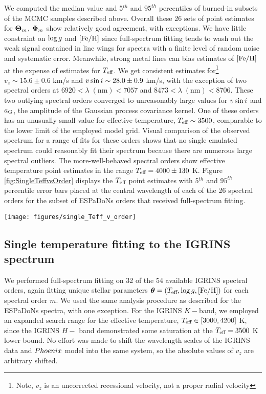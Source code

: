 \documentclass[onecolumn]{emulateapj}%
\begin{document}
We computed the median value and 5$^{th}$ and $95^{th}$ percentiles of burned-in subsets of the MCMC samples described above.  Overall these 26 sets of point estimates for ${\bm \Theta}_{m}$, ${\bm \Phi}_m$ show relatively good agreement, with exceptions.  We have little constraint on $\log g$ and $[{\rm Fe}/{\rm H}]$ since full-spectrum fitting tends to wash out the weak signal contained in line wings for spectra with a finite level of random noise and systematic error.  Meanwhile, strong metal lines can bias estimates of $[{\rm Fe}/{\rm H}]$ at the expense of estimates for $T_\textrm{eff}$.  We get consistent estimates for\footnote{Note, $v_z$ is an uncorrected recessional velocity, not a proper radial velocity} $v_z \sim 15.6 \pm 0.6$ km/s and $v \sin i \sim 28.0 \pm 0.9$ km/s, with the exception of two spectral orders at $6920 <\lambda \;(\mathrm{nm})< 7057$ and $8473 < \lambda \;(\mathrm{nm}) < 8706$.  These two outlying spectral orders converged to unreasonably large values for $v \sin i$ and $a_{\rm G}$, the amplitude of the Gaussian process covariance kernel.  One of these orders has an unusually small value for effective temperature, $T_\textrm{eff}\sim3500$, comparable to the lower limit of the employed model grid.  Visual comparison of the observed spectrum for a range of fits for these orders shows that no single emulated spectrum could reasonably fit their spectrum because there are numerous large spectral outliers.  The more-well-behaved spectral orders show effective temperature point estimates in the range $T_\textrm{eff}=4000\pm130$ K.  Figure \ref{fig:SingleTeffvsOrder} displays the $T_\textrm{eff}$ point estimates with 5$^{th}$ and $95^{th}$ percentile error bars placed at the central wavelength of each of the 26 spectral orders for the subset of ESPaDoNs orders that received full-spectrum fitting.  

\begin{figure*}
	\centering
	\texttt{[image: figures/single\_Teff\_v\_order]}
	\caption{Effective temperature as derived from unique full spectrum fitting to each of 58 spectral orders in the optical through infrared portions of the spectrum assuming a single component photosphere.  }
	\label{fig:SingleTeffvsOrder}
\end{figure*}

\subsection{Single temperature fitting to the IGRINS spectrum}

We performed full-spectrum fitting on 32 of the 54 available IGRINS spectral orders, again fitting unique stellar parameters ${\bm \theta} = (T_\textrm{eff}, \log g, [{\rm Fe}/{\rm H}])$ for each spectral order $m$.  We used the same analysis procedure as described for the ESPaDoNs spectra, with one exception.  For the IGRINS $K-$band, we employed an expanded search range for the effective temperature, $T_\textrm{eff} \in [3000, 4200]$ K, since the IGRINS $H-$ band demonstrated some saturation at the $T_\textrm{eff}=3500$ K lower bound.  No effort was made to shift the wavelength scales of the IGRINS data and ${\sc Phoenix}$ model into the same system, so the absolute values of $v_z$ are arbitrary shifted.
\end{document}
